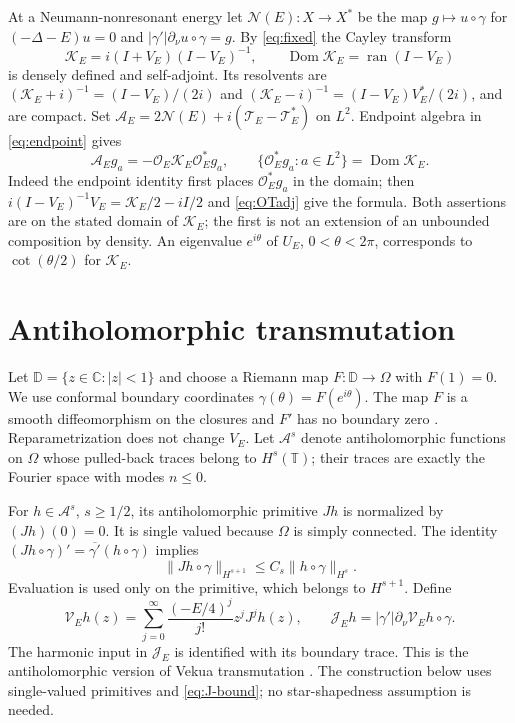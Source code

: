 \documentclass[11pt]{amsart}
\numberwithin{equation}{section}
\newcommand{\T}{\mathbb T}
\newcommand{\OO}{\mathcal O}
\newcommand{\TT}{\mathcal T}
\newcommand{\KK}{\mathcal K}
\newcommand{\NN}{\mathcal N}
\newcommand{\Aop}{\mathcal A}
\newcommand{\JJ}{\mathcal J}
\newcommand{\VV}{\mathcal V}
\newcommand{\ran}{\operatorname{ran}}
\newcommand{\Dom}{\operatorname{Dom}}
\newcommand{\norm}[1]{\lVert #1\rVert}
\begin{document}
At a Neumann-nonresonant energy let $\NN(E):X\to X^*$ be the map
$g\mapsto u\circ\gamma$ for $(-\Delta-E)u=0$ and
$|\gamma'|\partial_\nu u\circ\gamma=g$. By \eqref{eq:fixed} the Cayley
transform
\[
 \KK_E=i(I+V_E)(I-V_E)^{-1},\qquad
 \Dom\KK_E=\ran(I-V_E)
\]
is densely defined and self-adjoint. Its resolvents are
$(\KK_E+i)^{-1}=(I-V_E)/(2i)$ and
$(\KK_E-i)^{-1}=(I-V_E)V_E^*/(2i)$, and are compact.
Set $\Aop_E=2\NN(E)+i(\TT_E-\TT_E^*)$ on $L^2$.
Endpoint algebra in \eqref{eq:endpoint} gives
\begin{equation}\label{eq:factor}
 \Aop_Eg_a=-\OO_E\KK_E\OO_E^*g_a,
 \qquad\{\OO_E^*g_a:a\in L^2\}=\Dom\KK_E.
\end{equation}
Indeed the endpoint identity first places $\OO_E^*g_a$ in the domain;
then $i(I-V_E)^{-1}V_E=\KK_E/2-iI/2$ and
\eqref{eq:OTadj} give the formula. Both assertions are on the stated domain of $\KK_E$; the first
is not an extension of an unbounded composition by density. An eigenvalue $e^{i\theta}$ of $U_E$,
$0<\theta<2\pi$, corresponds to $\cot(\theta/2)$ for $\KK_E$.

\section{Antiholomorphic transmutation}\label{sec:transmutation}

Let $\mathbb D=\{z\in\mathbb C:|z|<1\}$ and choose a Riemann
map $F:\mathbb D\to\Omega$ with $F(1)=0$. We use conformal
boundary coordinates $\gamma(\theta)=F(e^{i\theta})$. The map
$F$ is a smooth diffeomorphism on the closures
and $F'$ has no boundary zero \cite{Pommerenke}. Reparametrization does
not change $V_E$. Let $\mathscr A^s$ denote antiholomorphic functions on
$\Omega$ whose pulled-back traces belong to $H^s(\T)$; their traces are
exactly the Fourier space with modes $n\le0$.

For $h\in\mathscr A^s$, $s\ge1/2$, its antiholomorphic primitive $Jh$
is normalized by $(Jh)(0)=0$. It is single valued because $\Omega$ is
simply connected. The identity
$(Jh\circ\gamma)'=\overline{\gamma'}(h\circ\gamma)$ implies
\begin{equation}\label{eq:J-bound}
 \norm{Jh\circ\gamma}_{H^{s+1}}\le C_s\norm{h\circ\gamma}_{H^s}.
\end{equation}
Evaluation is used only on the primitive, which belongs to $H^{s+1}$.
Define
\begin{equation}\label{eq:Vekua}
 \VV_Eh(z)=\sum_{j=0}^\infty\frac{(-E/4)^j}{j!}z^jJ^jh(z),
 \qquad \JJ_Eh=|\gamma'|\partial_\nu\VV_Eh\circ\gamma.
\end{equation}
The harmonic input in $\JJ_E$ is identified with its boundary trace.
This is the antiholomorphic version of Vekua transmutation
\cite{Vekua,MHP}. The construction below uses single-valued primitives
and \eqref{eq:J-bound}; no star-shapedness assumption is needed.
\end{document}
